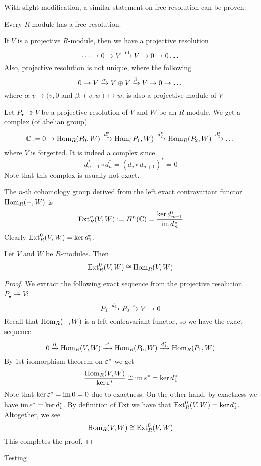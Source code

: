 With slight modification, a similar statement on free resolution can be proven:

\medskip

\begin{pro}
    Every $R$-module has a free resolution.
\end{pro}

\medskip

\begin{re}
    If $V$ is a projective $R$-module, then we have a projective resolution
    \[\dots \to 0 \to V \xrightarrow{\operatorname{id}} V \to 0 \to 0 \dots\]
    Also, projective resolution is not unique, where the following
    \[0 \to V \xrightarrow{\alpha} V\oplus V \xrightarrow{\beta} V \to 0 \to \dots\]
    where $\alpha:v\mapsto (v,0$ and $\beta:(v,w)\mapsto w$, is also a projective module of $V$
\end{re}

\medskip

\begin{defn}
    Let $P_\bullet \twoheadrightarrow V$ be a projective resolution of $V$ and $W$ be an $R$-module. We get a complex (of abelian group)
    \[{\mathbb C}:=0 \to \operatorname{Hom}_R(P_0, W)\xrightarrow{d_1^*} \operatorname{Hom}_(P_1, W) \xrightarrow{d_2^*} \operatorname{Hom}_R(P_2, W)\xrightarrow{d^*_3}\dots\]
    where $V$ is forgetted. It is indeed a complex since
    \[d_{n+1}^*\circ d_n^* = (d_n \circ d_{n+1})^* = 0\]
    Note that this complex is usually not exact.

    The $n$-th cohomology group derived from the left exact contravariant functor $\operatorname{Hom}_R(-, W)$ is 
    \[\operatorname{Ext}_R^n(V,W):= H^n({\mathbb C})=\frac{\ker d_{n+1}^*}{\operatorname{im} d_n^*}\]
    Clearly $\operatorname{Ext}_R^0(V,W) = \ker d_1 ^*$.
\end{defn}

\medskip

\begin{pro}
    Let $V$ and $W$ be $R$-modules. Then
    \[\operatorname{Ext}^0_R(V,W) \cong \operatorname{Hom}_R(V,W)\]
\end{pro}
\begin{proof}
    We extract the following exact sequence from the projective resolution $P_\bullet \twoheadrightarrow V$:
    \[P_1 \xrightarrow{d_1} P_0 \xrightarrow{\varepsilon} V \to 0\]
    Recall that $\operatorname{Hom}_R(-,W)$ is a left contravariant functor, so we have the exact sequence
    \[0 \xrightarrow{0} \operatorname{Hom}_R(V,W) \xrightarrow{\varepsilon^*} \operatorname{Hom}_R(P_0, W) \xrightarrow{d_1^*} \operatorname{Hom}_R(P_1,W)\]
    By 1st isomorphism theorem on $\varepsilon^*$ we get 
    \[\frac{\operatorname{Hom}_R(V,W)}{\ker \varepsilon^*}\cong \operatorname{im}\varepsilon^* = \ker d_1^*\]
    Note that $\ker \varepsilon^* = \operatorname{im} 0 = 0$ due to exactness. On the other hand, by exactness we have $\operatorname{im} \varepsilon^* = \ker d_1^*$. By definition of Ext we have that $\operatorname{Ext}^0_R(V,W) = \ker d_1^*$. Altogether, we see
    \[\operatorname{Hom}_R(V,W) \cong \operatorname{Ext}_R^0(V,W)\]
    This completes the proof.
\end{proof}

Testing